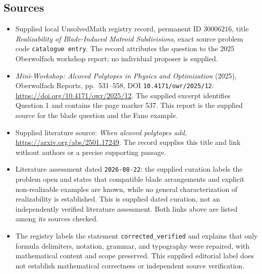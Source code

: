 \documentclass[11pt]{article}
\begin{document}
\subsection{Sources}
\begin{itemize}
\item Supplied local UnsolvedMath registry record, permanent ID \(30006216\), title \emph{Realizability of Blade-Induced Matroid Subdivisions}, exact source problem code \texttt{catalogue entry}. The record attributes the question to the 2025 Oberwolfach workshop report; no individual proposer is supplied.
\item \emph{Mini-Workshop: Alcoved Polytopes in Physics and Optimization} (2025), Oberwolfach Reports, pp.\ 531--558, DOI \texttt{10.4171/owr/2025/12}: \url{https://doi.org/10.4171/owr/2025/12}. The supplied excerpt identifies Question 1 and contains the page marker 537. This report is the supplied source for the blade question and the Fano example.
\item Supplied literature source: \emph{When alcoved polytopes add}, \url{https://arxiv.org/abs/2501.17249}. The record supplies this title and link without authors or a precise supporting passage.
\item Literature assessment dated \texttt{2026-08-22}: the supplied curation labels the problem open and states that compatible blade arrangements and explicit non-realizable examples are known, while no general characterization of realizability is established. This is supplied dated curation, not an independently verified literature assessment. Both links above are listed among its sources checked.
\item The registry labels the statement \texttt{corrected\_verified} and explains that only formula delimiters, notation, grammar, and typography were repaired, with mathematical content and scope preserved. This supplied editorial label does not establish mathematical correctness or independent source verification.
\end{itemize}
\end{document}
